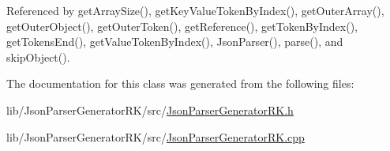 Referenced by get\+Array\+Size(), get\+Key\+Value\+Token\+By\+Index(), get\+Outer\+Array(), get\+Outer\+Object(), get\+Outer\+Token(), get\+Reference(), get\+Token\+By\+Index(), get\+Tokens\+End(), get\+Value\+Token\+By\+Index(), Json\+Parser(), parse(), and skip\+Object().



The documentation for this class was generated from the following files\+:\begin{DoxyCompactItemize}
\item 
lib/\+Json\+Parser\+Generator\+R\+K/src/\hyperlink{_json_parser_generator_r_k_8h}{Json\+Parser\+Generator\+R\+K.\+h}\item 
lib/\+Json\+Parser\+Generator\+R\+K/src/\hyperlink{_json_parser_generator_r_k_8cpp}{Json\+Parser\+Generator\+R\+K.\+cpp}\end{DoxyCompactItemize}
